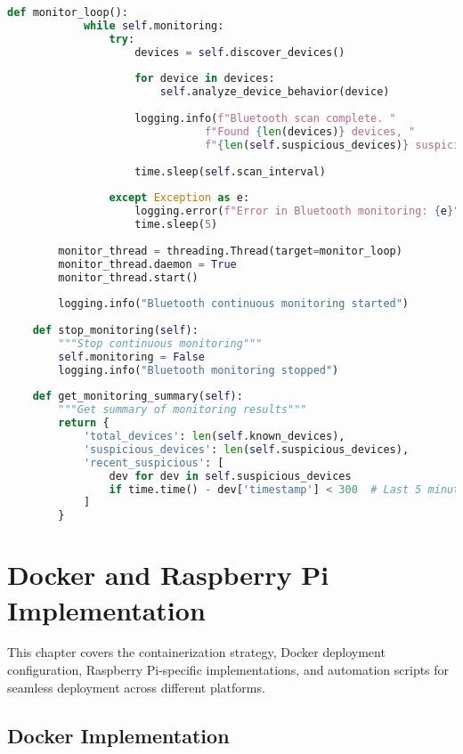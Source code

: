 \documentclass[12pt,a4paper]{report}
\begin{document}
\begin{lstlisting}[language=Python, caption=Bluetooth Attack Detection System]
        def monitor_loop():
            while self.monitoring:
                try:
                    devices = self.discover_devices()
                    
                    for device in devices:
                        self.analyze_device_behavior(device)
                    
                    logging.info(f"Bluetooth scan complete. "
                               f"Found {len(devices)} devices, "
                               f"{len(self.suspicious_devices)} suspicious")
                    
                    time.sleep(self.scan_interval)
                    
                except Exception as e:
                    logging.error(f"Error in Bluetooth monitoring: {e}")
                    time.sleep(5)
        
        monitor_thread = threading.Thread(target=monitor_loop)
        monitor_thread.daemon = True
        monitor_thread.start()
        
        logging.info("Bluetooth continuous monitoring started")
    
    def stop_monitoring(self):
        """Stop continuous monitoring"""
        self.monitoring = False
        logging.info("Bluetooth monitoring stopped")
    
    def get_monitoring_summary(self):
        """Get summary of monitoring results"""
        return {
            'total_devices': len(self.known_devices),
            'suspicious_devices': len(self.suspicious_devices),
            'recent_suspicious': [
                dev for dev in self.suspicious_devices 
                if time.time() - dev['timestamp'] < 300  # Last 5 minutes
            ]
        }
\end{lstlisting}

\chapter{Docker and Raspberry Pi Implementation}

This chapter covers the containerization strategy, Docker deployment configuration, Raspberry Pi-specific implementations, and automation scripts for seamless deployment across different platforms.

\section{Docker Implementation}
\end{document}
